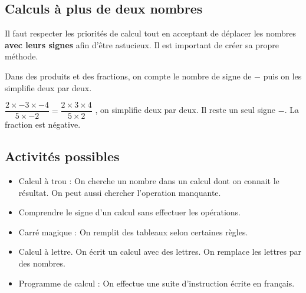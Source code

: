 \documentclass[12pt]{article}
\begin{document}
\subsection*{Calculs à plus de deux nombres}

Il faut respecter les priorités de calcul tout en acceptant de \og déplacer les nombres \fg \textbf{avec leurs signes} afin d'être astucieux. Il est important de créer sa propre méthode. 

Dans des produits et des fractions, on compte le nombre de signe de $-$ puis on les simplifie deux par deux.

$\dfrac{2 \times -3 \times -4}{5 \times  -2} = \dfrac{2 \times 3 \times 4}{5 \times  2}$ , on simplifie deux par deux. Il reste un seul signe $-$. La fraction est négative.


\subsection*{Activités possibles}

\begin{itemize}
\item Calcul à trou : On cherche un nombre dans un calcul dont on connait le résultat. On peut aussi chercher l'operation manquante. 
\item Comprendre le signe d'un calcul sans effectuer les opérations. 
\item Carré magique : On remplit des tableaux selon certaines règles.
\item Calcul à lettre. On écrit un calcul avec des lettres. On remplace les lettres par des nombres.
\item Programme de calcul : On effectue une suite d'instruction écrite en français.
\end{itemize}
\end{document}
